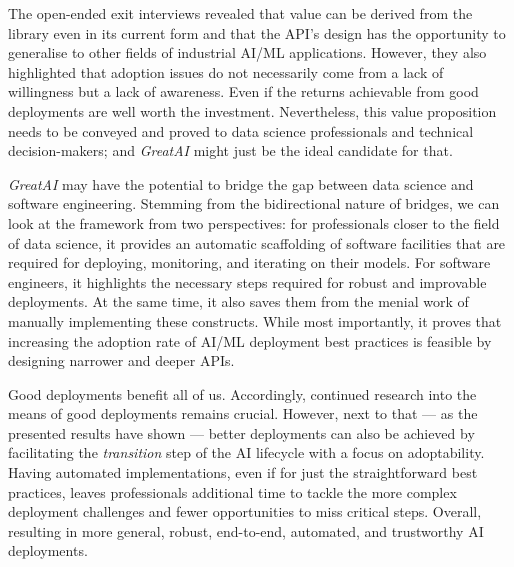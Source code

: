 The open-ended exit interviews revealed that value can be derived from the library even in its current form and that the API's design has the opportunity to generalise to other fields of industrial AI/ML applications. However, they also highlighted that adoption issues do not necessarily come from a lack of willingness but a lack of awareness. Even if the returns achievable from good deployments are well worth the investment. Nevertheless, this value proposition needs to be conveyed and proved to data science professionals and technical decision-makers; and \textit{GreatAI} might just be the ideal candidate for that.

\textit{GreatAI} may have the potential to bridge the gap between data science and software engineering. Stemming from the bidirectional nature of bridges, we can look at the framework from two perspectives: for professionals closer to the field of data science, it provides an automatic scaffolding of software facilities that are required for deploying, monitoring, and iterating on their models. For software engineers, it highlights the necessary steps required for robust and improvable deployments. At the same time, it also saves them from the menial work of manually implementing these constructs. While most importantly, it proves that increasing the adoption rate of AI/ML deployment best practices is feasible by designing narrower and deeper APIs.

Good deployments benefit all of us. Accordingly, continued research into the means of good deployments remains crucial. However, next to that --- as the presented results have shown --- better deployments can also be achieved by facilitating the \textit{transition} step of the AI lifecycle with a focus on adoptability. Having automated implementations, even if for just the straightforward best practices, leaves professionals additional time to tackle the more complex deployment challenges and fewer opportunities to miss critical steps. Overall, resulting in more general, robust, end-to-end, automated, and trustworthy AI deployments.
